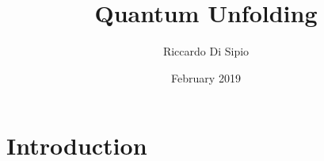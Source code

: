 \documentclass{article}
\title{Quantum Unfolding}
\author{Riccardo Di Sipio}
\date{February 2019}
\begin{document}
\maketitle

\section{Introduction}
\end{document}
